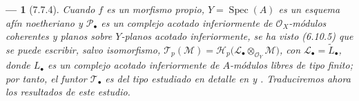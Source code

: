 \documentclass[10pt,oneside,openany]{book}
\theoremstyle{egaenv}\newtheorem*{env}{---}
\theoremstyle{egastatement}
\theoremstyle{egadescription}
\begin{document}
\begin{env}[7.7.4]
\label{III.7.7.4}
Cuando $f$ es un morfismo \emph{propio}, $Y=\operatorname{Spec}(A)$ es un
esquema afín noetheriano y $\mathscr P_\bullet$ es un complejo acotado
inferiormente de $\mathscr O_X$-módulos coherentes y planos sobre $Y$-planos \emph{acotado inferiormente}, se ha
visto (6.10.5) que se puede escribir, salvo isomorfismo,
$\mathscr T_p(\mathscr M)=\mathscr H_p\bigl(\mathscr L_\bullet\otimes_{\mathscr O_Y}\mathscr M\bigr)$,
con $\mathscr L_\bullet=\widetilde{L}_\bullet$,
donde $L_\bullet$ es un complejo acotado inferiormente de $A$-módulos libres
de tipo finito; por tanto, el funtor $\mathscr T_\bullet$ es del tipo estudiado
en detalle en  y . Traduciremos ahora los resultados
de este estudio.
\end{env}
\end{document}
